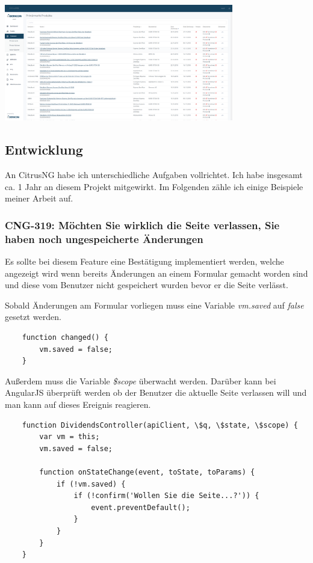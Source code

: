 \documentclass[chapterprefix=false, 12pt, a4paper, oneside, parskip=half, listof=totoc, bibliography=totoc, numbers=noendperiod]{scrbook}
\begin{document}
    \begin{center}
        \includegraphics[width=0.75\textwidth]{img/citrusng.png}
    \end{center}

    \subsection{Entwicklung}

    An CitrusNG habe ich unterschiedliche Aufgaben vollrichtet. Ich habe insgesamt ca. 1 Jahr an diesem Projekt mitgewirkt.
    Im Folgenden zähle ich einige Beispiele meiner Arbeit auf.

    \subsubsection{CNG-319: Möchten Sie wirklich die Seite verlassen, Sie haben noch ungespeicherte Änderungen}

    Es sollte bei diesem Feature eine Bestätigung implementiert werden, welche angezeigt wird wenn bereits Änderungen an einem Formular
    gemacht worden sind und diese vom Benutzer nicht gespeichert wurden bevor er die Seite verlässt.

    Sobald Änderungen am Formular vorliegen muss eine Variable \textit{vm.saved} auf \textit{false} gesetzt werden.

    \begin{verbatim}
    function changed() {
        vm.saved = false;
    }
    \end{verbatim}

    Außerdem muss die Variable \textit{\$scope} überwacht werden. Darüber kann bei AngularJS überprüft werden ob der
    Benutzer die aktuelle Seite verlassen will und man kann auf dieses Ereignis reagieren.

    \begin{verbatim}
    function DividendsController(apiClient, \$q, \$state, \$scope) {
        var vm = this;
        vm.saved = false;

        function onStateChange(event, toState, toParams) {
            if (!vm.saved) {
                if (!confirm('Wollen Sie die Seite...?')) {
                    event.preventDefault();
                }
            }
        }
    }
    \end{verbatim}
\end{document}

